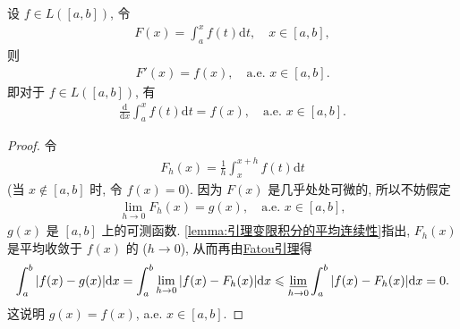 \documentclass[../../main.tex]{subfiles}%
\begin{document}
\begin{theorem}\label{theorem:Lebesgue变限积分的导数}
设 $f\in L([a,b])$, 令
\begin{align*}
F(x) = \int_a^x f(t)\mathrm{d}t, \quad x\in[a,b],
\end{align*}
则
\begin{align*}
F'(x) = f(x), \quad \text{a.e. } x\in[a,b].
\end{align*}
即对于 $f\in L([a,b])$, 有
\begin{align*}
\frac{\mathrm{d}}{\mathrm{d}x}\int_a^x f(t)\mathrm{d}t = f(x), \quad \text{a.e. } x\in[a,b].
\end{align*}
\end{theorem}
\begin{proof}
令
\begin{align*}
F_h(x) = \frac{1}{h}\int_x^{x+h} f(t)\mathrm{d}t
\end{align*}
(当 $x\notin [a,b]$ 时, 令 $f(x)=0$). 因为 $F(x)$ 是几乎处处可微的, 所以不妨假定
\begin{align*}
\lim_{h\to 0} F_h(x) = g(x), \quad \text{a.e. } x\in[a,b],
\end{align*}
$g(x)$ 是 $[a,b]$ 上的可测函数. \cref{lemma:引理变限积分的平均连续性}指出, $F_h(x)$ 是平均收敛于 $f(x)$ 的 ($h\to 0$), 从而再由\hyperref[theorem:Fatou引理]{Fatou引理}得
\begin{align*}
\int_a^b |f(x)-g(x)|\mathrm{d}x = \int_a^b \lim_{h\to 0} |f(x)-F_h(x)|\mathrm{d}x \leqslant \varliminf_{h\to 0} \int_a^b |f(x)-F_h(x)|\mathrm{d}x = 0.
\end{align*}
这说明 $g(x)=f(x)$, a.e. $x\in[a,b]$.
\end{proof}
\end{document}
